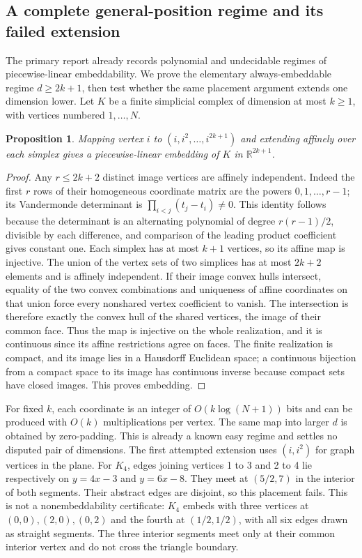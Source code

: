 \documentclass[11pt]{article}
\newtheorem{proposition}{Proposition}
\begin{document}
\subsection{A complete general-position regime and its failed extension}
The primary report already records polynomial and undecidable regimes of piecewise-linear embeddability. We prove the elementary always-embeddable regime $d\ge2k+1$, then test whether the same placement argument extends one dimension lower. Let $K$ be a finite simplicial complex of dimension at most $k\ge1$, with vertices numbered $1,\ldots,N$.
\begin{proposition}
Mapping vertex $i$ to $(i,i^2,\ldots,i^{2k+1})$ and extending affinely over each simplex gives a piecewise-linear embedding of $K$ in $\mathbb R^{2k+1}$.
\end{proposition}
\begin{proof}
Any $r\le2k+2$ distinct image vertices are affinely independent. Indeed the first $r$ rows of their homogeneous coordinate matrix are the powers $0,1,\ldots,r-1$; its Vandermonde determinant is $\prod_{i<j}(t_j-t_i)\ne0$. This identity follows because the determinant is an alternating polynomial of degree $r(r-1)/2$, divisible by each difference, and comparison of the leading product coefficient gives constant one.
Each simplex has at most $k+1$ vertices, so its affine map is injective. The union of the vertex sets of two simplices has at most $2k+2$ elements and is affinely independent. If their image convex hulls intersect, equality of the two convex combinations and uniqueness of affine coordinates on that union force every nonshared vertex coefficient to vanish. The intersection is therefore exactly the convex hull of the shared vertices, the image of their common face. Thus the map is injective on the whole realization, and it is continuous since its affine restrictions agree on faces. The finite realization is compact, and its image lies in a Hausdorff Euclidean space; a continuous bijection from a compact space to its image has continuous inverse because compact sets have closed images. This proves embedding.
\end{proof}
For fixed $k$, each coordinate is an integer of $O(k\log(N+1))$ bits and can be produced with $O(k)$ multiplications per vertex. The same map into larger $d$ is obtained by zero-padding. This is already a known easy regime and settles no disputed pair of dimensions.
The first attempted extension uses $(i,i^2)$ for graph vertices in the plane. For $K_4$, edges joining vertices 1 to 3 and 2 to 4 lie respectively on $y=4x-3$ and $y=6x-8$. They meet at $(5/2,7)$ in the interior of both segments. Their abstract edges are disjoint, so this placement fails. This is not a nonembeddability certificate: $K_4$ embeds with three vertices at $(0,0),(2,0),(0,2)$ and the fourth at $(1/2,1/2)$, with all six edges drawn as straight segments. The three interior segments meet only at their common interior vertex and do not cross the triangle boundary.
\end{document}
